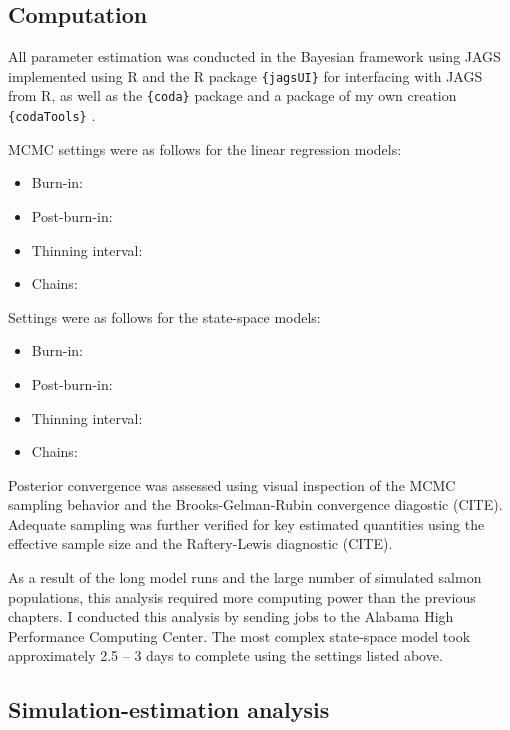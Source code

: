 \documentclass[12pt,]{book}
\providecommand{\tightlist}{%
  \setlength{\itemsep}{0pt}\setlength{\parskip}{0pt}}
\theoremstyle{definition}
\theoremstyle{definition}
\theoremstyle{definition}
\theoremstyle{remark}
\begin{document}
\subsection{Computation}\label{computation}

All parameter estimation was conducted in the Bayesian framework using
JAGS \citep{plummer-2017} implemented using R \citep{r-cite} and the R
package \texttt{\{jagsUI\}} \citep{r-jagsUI} for interfacing with JAGS
from R, as well as the \texttt{\{coda\}} \citep{r-coda} package and a
package of my own creation \texttt{\{codaTools\}} \citep{r-codaTools}.

\noindent
MCMC settings were as follows for the linear regression models:

\begin{itemize}
\tightlist
\item
  Burn-in:
\item
  Post-burn-in:
\item
  Thinning interval:
\item
  Chains:
\end{itemize}

\noindent
Settings were as follows for the state-space models:

\begin{itemize}
\tightlist
\item
  Burn-in:
\item
  Post-burn-in:
\item
  Thinning interval:
\item
  Chains:
\end{itemize}

Posterior convergence was assessed using visual inspection of the MCMC
sampling behavior and the Brooks-Gelman-Rubin convergence diagostic
(CITE). Adequate sampling was further verified for key estimated
quantities using the effective sample size and the Raftery-Lewis
diagnostic (CITE).

As a result of the long model runs and the large number of simulated
salmon populations, this analysis required more computing power than the
previous chapters. I conducted this analysis by sending jobs to the
Alabama High Performance Computing Center. The most complex state-space
model took approximately 2.5 -- 3 days to complete using the settings
listed above.

\subsection{Simulation-estimation
analysis}\label{simulation-estimation-analysis}
\end{document}
